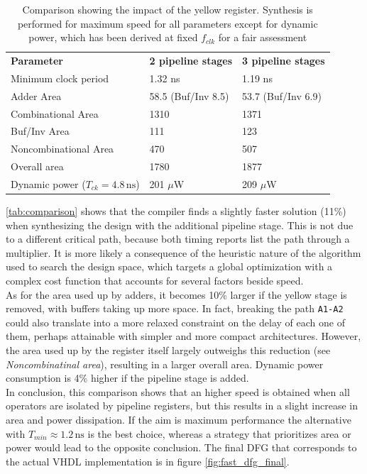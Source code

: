 \begin{table}[h]
	\centering
\begin{tabular}{|l|l|l|}
	\hline
\textbf{Parameter}	&  \textbf{2 pipeline stages} & \textbf{3 pipeline stages} \\\hhline{|=|=|=|}
Minimum clock period & 1.32 ns & 1.19 ns\\\hline
Adder Area & 58.5 (Buf/Inv 8.5) & 53.7 (Buf/Inv 6.9)\\
Combinational Area & 1310 & 1371\\
Buf/Inv Area& 111 & 123\\
Noncombinational Area& 470 & 507\\
Overall area & 1780 & 1877\\
\hline
Dynamic power ($T_{ck}=4.8\,\textrm{ns}$) & 201 $\mu$W & 209 $\mu$W \\
\hline
\end{tabular}
\caption{Comparison showing the impact of the yellow register. Synthesis is performed for maximum speed for all parameters except for dynamic power, which has been derived at fixed $f_{clk}$ for a fair assessment}
\label{tab:comparison}
\end{table}

\autoref{tab:comparison} shows that the compiler finds a slightly faster solution (11\%) when synthesizing the design with the additional pipeline stage. This is not due to a different critical path, because both timing reports list the path through a multiplier. It is more likely a consequence of the heuristic nature of the algorithm used to search the design space, which targets a global optimization with a complex cost function that accounts for several factors beside speed.\\
As for the area used up by adders, it becomes 10\% larger if the yellow stage is removed, with buffers taking up more space. In fact, breaking the path \texttt{A1-A2} could also translate into a more relaxed constraint on the delay of each one of them, perhaps attainable with simpler and more compact architectures. However, the area used up by the register itself largely outweighs this reduction (see \textit{Noncombinatinal area}), resulting in a larger overall area. Dynamic power consumption is 4\% higher if the pipeline stage is added. 
\\In conclusion, this comparison shows that an higher speed is obtained when all operators are isolated by pipeline registers, but this results in a slight increase in area and power dissipation. If the aim is maximum performance the alternative with $T_{min}\approx 1.2 \,\textrm{ns}$ is the best choice, whereas a strategy that prioritizes area or power would lead to the opposite conclusion.
The final DFG that corresponds to the actual VHDL implementation is in figure \ref{fig:fast_dfg_final}.
